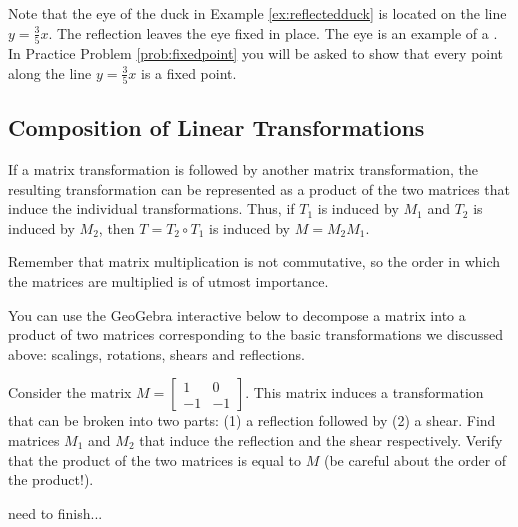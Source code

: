 \documentclass{ximera}
\begin{document}
Note that the eye of the duck in Example \ref{ex:reflectedduck} is located on the line $y=\frac{3}{5}x$.  The reflection leaves the eye fixed in place.  The eye is an example of a .  In Practice Problem \ref{prob:fixedpoint} you will be asked to show that every point along the line $y=\frac{3}{5}x$ is a fixed point.

\subsection*{Composition of Linear Transformations}

If a matrix transformation is followed by another matrix transformation, the resulting transformation can be represented as a product of the two matrices that induce the individual transformations.  Thus, if $T_1$ is induced by $M_1$ and $T_2$ is induced by $M_2$, then $T=T_2\circ T_1$ is induced by $M=M_2M_1$.

\begin{center}
\end{center}

Remember that matrix multiplication is not commutative, so the order in which the matrices are multiplied is of utmost importance.

\begin{exploration}\label{exp:matrixComp}
You can use the GeoGebra interactive below to decompose a matrix into a product of two matrices corresponding to the basic transformations we discussed above: scalings, rotations, shears and reflections.

Consider the matrix $M=\begin{bmatrix} 1 & 0\\-1 & -1\end{bmatrix}$.  This matrix induces a transformation that can be broken into two parts: (1) a reflection followed by (2) a shear.  Find matrices $M_1$ and $M_2$ that induce the reflection and the shear respectively.  Verify that the product of the two matrices is equal to $M$ (be careful about the order of the product!).
\begin{center}
\end{center}
need to finish...
\end{exploration}
\end{document}

